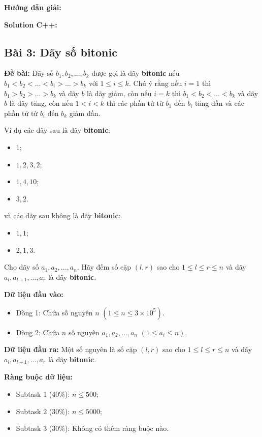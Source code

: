 \documentclass[12pt]{scrartcl}  %
\begin{document}
\textbf{Hướng dẫn giải:}

\textbf{Solution C++:}

\subsection{Bài 3: Dãy số bitonic}
\textbf{Đề bài:}
Dãy số $b_1, b_2, ... , b_k$ được gọi là dãy \textbf{bitonic} nếu $b_1 < b_2 < ... < b_i > ... > b_k$ với $1 \leq i \leq k$. Chú ý rằng nếu $i = 1$ thì $b_1 > b_2 > ... > b_k$ và dãy $b$ là dãy giảm, còn nếu $i = k$ thì $b_1 < b_2 < ... < b_k$ và dãy $b$ là dãy tăng, còn nếu $1 < i < k$ thì các phần tử từ $b_1$ đến $b_i$ tăng dần và các phần tử từ $b_i$ đến $b_k$ giảm dần.

Ví dụ các dãy sau là dãy \textbf{bitonic}:
\begin{itemize}
    \item $1$;
    \item $1, 2, 3, 2$;
    \item $1, 4, 10$;
    \item $3, 2$.
\end{itemize}
và các dãy sau không là dãy \textbf{bitonic}:
\begin{itemize}
    \item $1, 1$;
    \item $2, 1, 3$.
\end{itemize}
Cho dãy số $a_1, a_2, ... , a_n$. Hãy đếm số cặp $(l, r)$ sao cho $1 \leq l \leq r \leq n$ và dãy $a_l, a_{l + 1}, ..., a_r$ là dãy \textbf{bitonic}.

\textbf{Dữ liệu đầu vào:}
\begin{itemize}
    \item Dòng 1: Chứa số nguyên $n$ $(1 \leq n \leq 3 \times 10^5)$.
    \item Dòng 2: Chứa $n$ số nguyên $a_1, a_2, ..., a_n$ $(1 \leq a_i \leq n)$.
\end{itemize}

\textbf{Dữ liệu đầu ra:}
Một số nguyên là số cặp $(l, r)$ sao cho $1 \leq l \leq r \leq n$ và dãy $a_l, a_{l + 1}, ..., a_r$ là dãy \textbf{bitonic}.

\textbf{Ràng buộc dữ liệu:}
\begin{itemize}
    \item Subtask 1 (40\%): $n \leq 500$;
    \item Subtask 2 (30\%): $n \leq 5000$;
    \item Subtask 3 (30\%): Không có thêm ràng buộc nào.
\end{itemize}
\end{document}
